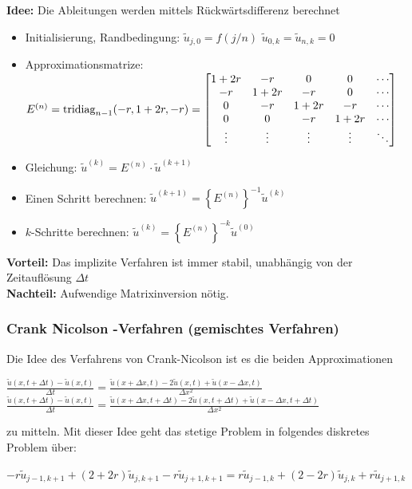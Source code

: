 \textbf{Idee:} Die Ableitungen werden mittels Rückwärtsdifferenz berechnet\\


\begin{itemize}
\item Initialisierung, Randbedingung: $\tilde{u}_{j,0}=f(j/n)$ \qquad $\tilde{u}_{0,k}=\tilde{u}_{n,k}=0$
\item Approximationsmatrize: $E^{(n)}=\operatorname{tridiag}_{n-1}(-r,1+2r,-r)=\begin{bmatrix}
1+2r& -r		& 0		& 0 	&\cdots\\
-r	& 1+2r  & -r		& 0		&\cdots\\
0	& -r		& 1+2r 	& -r 	&\cdots\\
0	& 0		& -r		& 1+2r 	&\cdots\\
\vdots&	\vdots&\vdots&\vdots&\ddots
\end{bmatrix}$
\item Gleichung: $\tilde{u}^{(k)}=E^{(n)} \cdot \tilde{u}^{(k + 1)}$
\item Einen Schritt berechnen: $\tilde{u}^{(k+1)}=\left\{E^{(n)}\right\}^{-1} \tilde{u}^{(k)}$
\item $k$-Schritte berechnen: $\tilde{u}^{(k)}=\left\{E^{(n)}\right\}^{\bm{-}k} \tilde{u}^{(0)}$
\end{itemize}

\textbf{Vorteil:} Das implizite Verfahren ist immer stabil, unabhängig von der Zeitauflösung $\Delta t$\\
\textbf{Nachteil:} Aufwendige Matrixinversion nötig.

\subsubsection{Crank Nicolson -Verfahren (gemischtes Verfahren)}

Die Idee des Verfahrens von Crank-Nicolson ist es die beiden Approximationen

$\boxed{\frac{\tilde{u}(x,t+\Delta t) - \tilde{u}(x,t)}{\Delta t} =
\frac{\tilde{u}(x+\Delta x, t)-2\tilde{u}(x,t) + \tilde{u}( x - \Delta x, t )} {\Delta x^2}}$\\
$\boxed{\frac{\tilde{u}(x,t+\Delta t) - \tilde{u}(x,t)}{\Delta t} =
\frac{\tilde{u}(x+\Delta x, t+\Delta t)-2\tilde{u}(x,t+\Delta t) + \tilde{u}( x - \Delta x, t +\Delta t)} {\Delta x^2}}$

zu mitteln. Mit dieser Idee geht das stetige Problem in folgendes diskretes Problem über:

$-r \tilde{u}_{j-1,k+1} + (2+2r)\tilde{u}_{j,k+1} - r \tilde{u}_{j+1,k+1} = r
\tilde{u}_{j-1,k} + (2-2r)\tilde{u}_{j,k} + r \tilde{u}_{j+1,k} $

